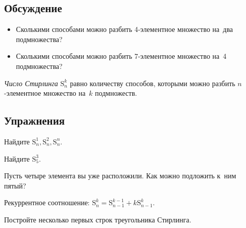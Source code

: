


\begingroup
    \def\StirlingN#1#2{\mathrm{S}_{#1}^{#2}}%
    \def\BellN#1{\mathrm{B}_{#1}}%

\subsection*{Обсуждение}

\begin{itemize}

\item
Сколькими способами можно разбить 4-эле\-мент\-ное множество на~два
подмножества?

\item
Сколькими способами можно разбить 7-эле\-мент\-ное множество на~4 подмножества?

\end{itemize}

\emph{Число Стирлинга} $\StirlingN{n}{k}$
равно количеству способов, которыми можно разбить $n$-эле\-мент\-ное множество
на~$k$ подмножеств.

\subsection*{Упражнения}

\begin{exercises}

\item
Найдите $\StirlingN{n}{1}, \StirlingN{n}{2}, \StirlingN{n}{n}$.

\item
Найдите $\StirlingN{5}{3}$.

\end{exercises}

Пусть четыре элемента вы уже расположили.
Как можно подложить к~ним пятый?
\par
Рекуррентное соотношение:
$\StirlingN{n}{k} = \StirlingN{n-1}{k-1} + k \StirlingN{n-1}{k}$.

\begin{exercises}

Постройте несколько первых строк треугольника Стирлинга.

\end{exercises}


